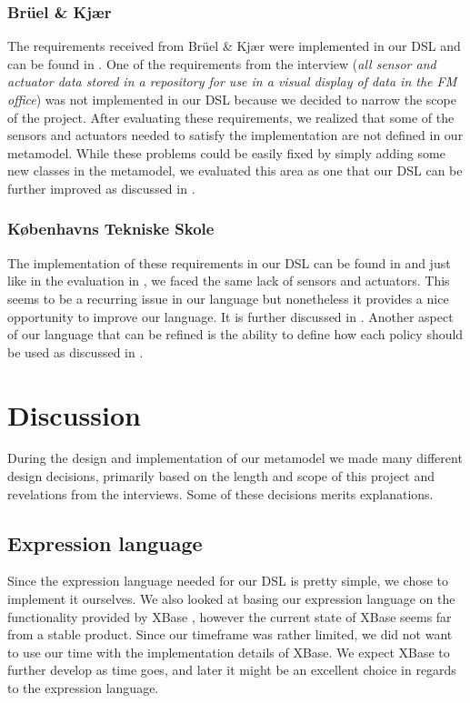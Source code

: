 \documentclass{llncs}
\begin{document}
\subsubsection{Br\"{u}el \& Kj\ae r}\label{subsec:bruel}
The requirements received from Br\"{u}el \& Kj\ae r were implemented in our DSL and can be found in . One of the requirements from the interview (\textit{all sensor and actuator data stored in a repository for use in a visual display of data in the FM office}) was not implemented in our DSL because we decided to narrow the scope of the project. After evaluating these requirements, we realized that some of the sensors and actuators needed to satisfy the implementation are not defined in our metamodel. While these problems could be easily fixed by simply adding some new classes in the metamodel, we evaluated this area as one that our DSL can be further improved as discussed in .

\subsubsection{K\o benhavns Tekniske Skole}\label{subsec:kts}
The implementation of these requirements in our DSL can be found in  and just like in the evaluation in , we faced the same lack of sensors and actuators. This seems to be a recurring issue in our language but nonetheless it provides a nice opportunity to improve our language. It is further discussed in . 
Another aspect of our language that can be refined is the ability to define how each policy should be used as discussed in . 
 
\section{Discussion}\label{sec:discussion}
During the design and implementation of our metamodel we made many different design decisions, primarily based on the length and scope of this project and revelations from the interviews. Some of these decisions merits explanations.

\subsection{Expression language}
Since the expression language needed for our DSL is pretty simple, we chose to implement it ourselves. We also looked at basing our expression language on the functionality provided by XBase \cite{xbase}, however the current state of XBase seems far from a stable product. Since our timeframe was rather limited, we did not want to use our time with the implementation details of XBase. We expect XBase to further develop as time goes, and later it might be an excellent choice in regards to the expression language.
\end{document}
